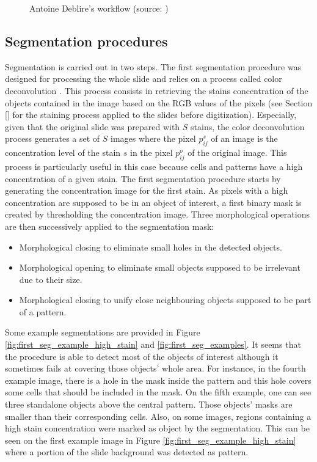\begin{figure}
	\center
	\caption{Antoine Deblire's workflow (source: \cite{adeblire2013})}
	\label{fig:workflow_adeblire}
\end{figure}

\subsection{Segmentation procedures}
\label{ssec:segmentation_proc}
Segmentation is carried out in two steps. The first segmentation procedure was designed for processing the whole slide and relies on a process called color deconvolution \cite{ruifrok2001quantification}. This process consists in retrieving the stains concentration of the objects contained in the image based on the RGB values of the pixels (see Section \ref{} for the staining process applied to the slides before digitization). Especially, given that the original slide was prepared with $S$ stains, the color deconvolution process generates a set of $S$ images where the pixel $p^s_{ij}$ of an image is the concentration level of the stain $s$ in the pixel $p^o_{ij}$ of the original image. This process is particularly useful in this case because cells and patterns have a high concentration of a given stain. The first segmentation procedure starts by generating the concentration image for the first stain. As pixels with a high concentration are supposed to be in an object of interest, a first binary mask is created by thresholding the concentration image. Three morphological operations are then successively applied to the segmentation mask:

\begin{itemize}
	\item Morphological closing to eliminate small holes in the detected objects.
	\item Morphological opening to eliminate small objects supposed to be irrelevant due to their size.
	\item Morphological closing to unify close neighbouring objects supposed to be part of a pattern.
\end{itemize}

Some example segmentations are provided in Figure \ref{fig:first_seg_example_high_stain} and \ref{fig:first_seg_examples}. It seems that the procedure is able to detect most of the objects of interest although it sometimes fails at covering those objects' whole area. For instance, in the fourth example image, there is a hole in the mask inside the pattern and this hole covers some cells that should be included in the mask. On the fifth example, one can see three standalone objects above the central pattern. Those objects' masks are smaller than their corresponding cells. Also, on some images, regions containing a high stain concentration were marked as object by the segmentation. This can be seen on the first example image in Figure \ref{fig:first_seg_example_high_stain} where a portion of the slide background was detected as pattern. 

